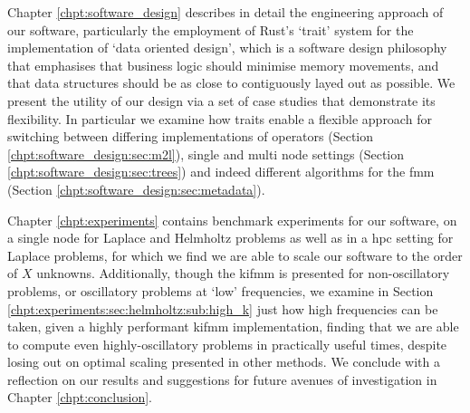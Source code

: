 Chapter \ref{chpt:software_design} describes in detail the engineering approach of our software, particularly the employment of Rust's `trait' system for the implementation of `data oriented design', which is a software design philosophy that emphasises that business logic should minimise memory movements, and that data structures should be as close to contiguously layed out as possible. We present the utility of our design via a set of case studies that demonstrate its flexibility. In particular we examine how traits enable a flexible approach for switching between differing implementations of operators (Section \ref{chpt:software_design:sec:m2l}), single and multi node settings (Section \ref{chpt:software_design:sec:trees}) and indeed different algorithms for the \acrshort{fmm} (Section \ref{chpt:software_design:sec:metadata}).

Chapter \ref{chpt:experiments} contains benchmark experiments for our software, on a single node for Laplace and Helmholtz problems as well as in a \acrshort{hpc} setting for Laplace problems, for which we find we are able to scale our software to the order of $X$ unknowns. Additionally, though the \acrshort{kifmm} is presented for non-oscillatory problems, or oscillatory problems at `low' frequencies, we examine in Section \ref{chpt:experiments:sec:helmholtz:sub:high_k} just how high frequencies can be taken, given a highly performant \acrshort{kifmm} implementation, finding that we are able to compute even highly-oscillatory problems in practically useful times, despite losing out on optimal scaling presented in other methods. We conclude with a reflection on our results and suggestions for future avenues of investigation in Chapter \ref{chpt:conclusion}.


